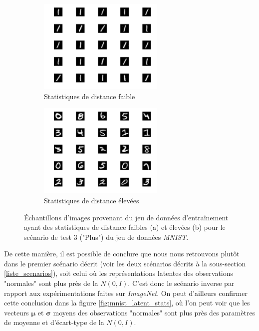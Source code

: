 \begin{figure}[h]
	\centering
	\begin{subfigure}{6cm}
		\centering\includegraphics[width=6cm]{images/images_davae/mnist_small_distance}
		\caption{Statistiques de distance faible}
	\end{subfigure}
	\begin{subfigure}{6cm}
		\centering\includegraphics[width=6cm]{images/images_davae/mnist_large_distance}
		\caption{Statistiques de distance élevées}
	\end{subfigure}
	\caption{Échantillons d'images provenant du jeu de données d'entraînement ayant des statistiques de distance faibles (a) et élevées (b) pour le scénario de test 3 ("Plus") du jeu de données \textit{MNIST}.}
	\label{fig:latentes_images_mnist}
\end{figure}

De cette manière, il est possible de conclure que nous nous retrouvons plutôt dans le premier scénario décrit (voir les deux scénarios décrits à la sous-section \ref{liste_scenarios}), soit celui où les représentations latentes des observations "normales" sont plus près de la $N(0,I)$. C'est donc le scénario inverse par rapport aux expérimentations faites sur \textit{ImageNet}. On peut d'ailleurs confirmer cette conclusion dans la figure \ref{fig:mnist_latent_stats}, où l'on peut voir que les vecteurs $\boldsymbol{\mu}$ et $\boldsymbol{\sigma}$ moyens des observations "normales" sont plus près des paramètres de moyenne et d'écart-type de la $N(0,I)$.

